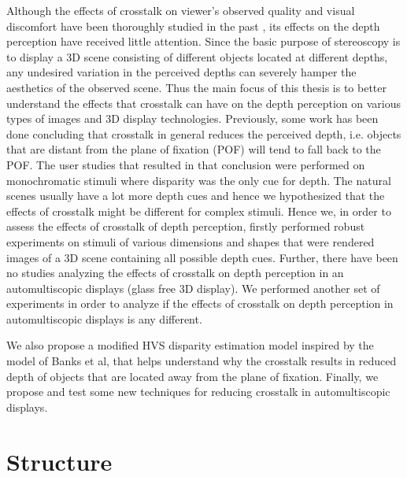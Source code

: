 Although the effects of crosstalk on viewer's observed quality and visual discomfort have been thoroughly studied in the past \cite{wilcox2003determinants}, its effects on the depth perception have received little attention. Since the basic purpose of stereoscopy is to display a 3D scene consisting of different objects located at different depths, any undesired variation in the perceived depths can severely hamper the aesthetics of the observed scene. Thus the main focus of this thesis is to better understand the effects that crosstalk can have on the depth perception on various types of images and 3D display technologies. Previously, some  work has been done concluding that crosstalk in general reduces the perceived depth\cite{tsirlin2012effect}, i.e. objects that are distant from the plane of fixation (POF) will tend to fall back to the POF. The user studies that resulted in that conclusion were performed on monochromatic stimuli where disparity was the only cue for depth. The natural scenes usually have a lot more depth cues and hence we hypothesized that the effects of crosstalk might be different for complex stimuli. Hence we, in order to assess the effects of crosstalk of depth perception, firstly performed robust experiments on stimuli of various dimensions and shapes that were rendered images of a 3D scene containing all possible depth cues. Further, there have been no studies analyzing the effects of crosstalk on depth perception in an automultiscopic displays (glass free 3D display). We performed another set of experiments in order to analyze if the effects of crosstalk on depth perception in automultiscopic displays is any different.

We also propose a modified HVS disparity estimation model inspired by the model of Banks et al\cite{filippini2009limits}, that helps understand why the crosstalk results in reduced depth of objects that are located away from the plane of fixation. Finally, we propose and test some new techniques for reducing crosstalk in automultiscopic displays.

\section{Structure}

